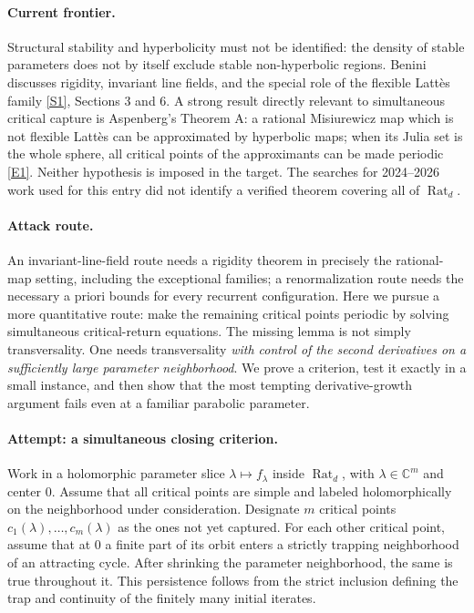 \documentclass[11pt,a4paper]{article}
\newcommand{\C}{\mathbb{C}}
\newcommand{\sref}[2]{\hyperlink{source:#1:#2}{[S#2]}}
\newcommand{\eref}[2]{\hyperlink{extra:#1:#2}{[E#2]}}
\numberwithin{equation}{section}
\begin{document}
\paragraph{Current frontier.}
Structural stability and hyperbolicity must not be identified: the density
of stable parameters does not by itself exclude stable non-hyperbolic
regions. Benini discusses rigidity, invariant line fields, and the special
role of the flexible Latt\`es family \sref{155}{1}, Sections 3 and 6.
A strong result directly relevant to simultaneous critical capture is
Aspenberg's Theorem A: a rational Misiurewicz map which is not flexible
Latt\`es can be approximated by hyperbolic maps; when its Julia set is the
whole sphere, all critical points of the approximants can be made periodic
\eref{155}{1}. Neither hypothesis is imposed in the target. The searches
for 2024--2026 work used for this entry did not identify a verified theorem
covering all of $\operatorname{Rat}_d$.

\paragraph{Attack route.}
An invariant-line-field route needs a rigidity theorem in precisely the
rational-map setting, including the exceptional families; a
renormalization route needs the necessary a priori bounds for every
recurrent configuration. Here we pursue a more quantitative route: make the
remaining critical points periodic by solving simultaneous critical-return
equations. The missing lemma is not simply transversality. One needs
transversality \emph{with control of the second derivatives on a sufficiently
large parameter neighborhood}. We prove a criterion, test it exactly in a
small instance, and then show that the most tempting derivative-growth
argument fails even at a familiar parabolic parameter.

\paragraph{Attempt: a simultaneous closing criterion.}
Work in a holomorphic parameter slice $\lambda\mapsto f_\lambda$ inside
$\operatorname{Rat}_d$, with $\lambda\in\C^m$ and center $0$. Assume that
all critical points are simple and labeled holomorphically on the
neighborhood under consideration. Designate $m$ critical points
$c_1(\lambda),\ldots,c_m(\lambda)$ as the ones not yet captured. For each
other critical point, assume that at $0$ a finite part of its orbit enters
a strictly trapping neighborhood of an attracting cycle. After shrinking
the parameter neighborhood, the same is true throughout it. This
persistence follows from the strict inclusion defining the trap and
continuity of the finitely many initial iterates.
\end{document}
